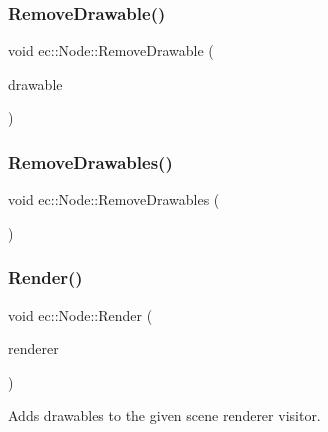 \mbox{\label{classec_1_1_node_acd641d3927ae368628ac90d5d79597d9}} 
\subsubsection{\texorpdfstring{Remove\+Drawable()}{RemoveDrawable()}}
{\footnotesize\ttfamily void ec\+::\+Node\+::\+Remove\+Drawable (\begin{DoxyParamCaption}\item[{\mbox{\hyperlink{classec_1_1_drawable}{Drawable}} $\ast$}]{drawable }\end{DoxyParamCaption})}

\mbox{\label{classec_1_1_node_ad874f229d3602ac6f0d0f0ce502a1fbc}} 
\subsubsection{\texorpdfstring{Remove\+Drawables()}{RemoveDrawables()}}
{\footnotesize\ttfamily void ec\+::\+Node\+::\+Remove\+Drawables (\begin{DoxyParamCaption}{ }\end{DoxyParamCaption})}

\mbox{\label{classec_1_1_node_ac606be4f6d5a899a0b9679b6767ff109}} 
\subsubsection{\texorpdfstring{Render()}{Render()}}
{\footnotesize\ttfamily void ec\+::\+Node\+::\+Render (\begin{DoxyParamCaption}\item[{\mbox{\hyperlink{classec_1_1_scene_renderer}{Scene\+Renderer}} \&}]{renderer }\end{DoxyParamCaption})\hspace{0.3cm}{\ttfamily [virtual]}}

Adds drawables to the given scene renderer visitor. \mbox{\label{classec_1_1_node_abda1732f28b0f81df2028d889eb73bdf}} 
